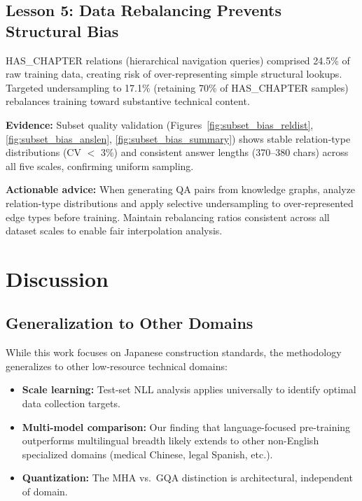 \documentclass[twocolumn]{article}
\begin{document}
\subsection{Lesson 5: Data Rebalancing Prevents Structural Bias}

HAS\_CHAPTER relations (hierarchical navigation queries) comprised 24.5\% of raw training
data, creating risk of over-representing simple structural lookups.
Targeted undersampling to 17.1\% (retaining 70\% of HAS\_CHAPTER samples) rebalances
training toward substantive technical content.

\textbf{Evidence:} Subset quality validation (Figures~\ref{fig:subset_bias_reldist}, \ref{fig:subset_bias_anslen}, \ref{fig:subset_bias_summary}) shows stable
relation-type distributions (CV $<$ 3\%) and consistent answer lengths (370--380 chars)
across all five scales, confirming uniform sampling.

\textbf{Actionable advice:} When generating QA pairs from knowledge graphs, analyze
relation-type distributions and apply selective undersampling to over-represented
edge types before training. Maintain rebalancing ratios consistent across all dataset
scales to enable fair interpolation analysis.

\section{Discussion}
\label{sec:discussion}

\subsection{Generalization to Other Domains}

While this work focuses on Japanese construction standards, the methodology generalizes
to other low-resource technical domains:
\begin{itemize}
  \item \textbf{Scale learning:} Test-set NLL analysis applies universally to identify
        optimal data collection targets.
  \item \textbf{Multi-model comparison:} Our finding that language-focused pre-training
        outperforms multilingual breadth likely extends to other non-English specialized
        domains (medical Chinese, legal Spanish, etc.).
  \item \textbf{Quantization:} The MHA vs.\ GQA distinction is architectural, independent
        of domain.
\end{itemize}
\end{document}

